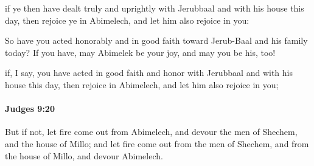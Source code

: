 			\begin{versebox}
					\item[BHS] 
					\item[ASV] if ye then have dealt truly and uprightly with Jerubbaal and with his house this day, then rejoice ye in Abimelech, and let him also rejoice in you:
					\item[NIV] So have you acted honorably and in good faith toward Jerub-Baal and his family today? If you have, may Abimelek be your joy, and may you be his, too!
					\item[NRSV] if, I say, you have acted in good faith and honor with Jerubbaal and with his house this day, then rejoice in Abimelech, and let him also rejoice in you;
			\end{versebox}

		\paragraph{Judges 9:20} %
			\label{JUDGES-9-20}

			But if not, let fire come out from Abimelech, and devour the men of Shechem, and the house of Millo; and let fire come out from the men of Shechem, and from the house of Millo, and devour Abimelech.


